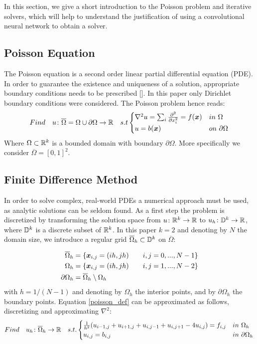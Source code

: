 In this section, we give a short introduction to the Poisson problem and iterative solvers, which will help to understand the justification of using a convolutional neural network to obtain a solver.

\subsection{Poisson Equation}

The Poisson equation is a second order linear partial differential equation (PDE). In order to guarantee the existence and uniqueness of a solution, appropriate boundary conditions needs to be prescribed [\cite{elliptic}]. In this paper only Dirichlet boundary conditions were considered.
The Poisson problem hence reads:
\begin{equation}
Find \quad u \colon \overline{\Omega}=\Omega\cup\partial\Omega \to {\mathbb{R}} \quad s.t
\begin{cases}
\nabla^2 u = \sum_{i}\frac{\partial^2}{\partial x_i^2} = f({\bm{x}}) & in \ \Omega\\
u = b({\bm{x}}) & on \ \partial \Omega\\
\end{cases}
\label{poisson_def}
\end{equation}
Where $\Omega \subset {\mathbb{R}}^k$ is a bounded domain with boundary $\partial\Omega$. More specifically we consider $\overline{\Omega} = [0,1]^2$.

\subsection{Finite Difference Method}
In order to solve complex, real-world PDEs a numerical approach must be used, as analytic solutions can be seldom found. As a first step the problem is discretized by transforming the solution space from $u\colon{\mathbb{R}}^k \to {\mathbb{R}}$ to $u_h\colon{\mathbb{D}}^k \to {\mathbb{R}}$, where ${\mathbb{D}}^k$ is a discrete subset of ${\mathbb{R}}^k$. In this paper $k = 2$ and denoting by $N$ the domain size, we introduce a regular grid $\overline{\Omega}_h \subset {\mathbb{D}}^k$ on  $\overline{\Omega}$: 

\begin{align*}
\overline{\Omega}_h &= \{{\bm{x}}_{i,j} = (ih, jh) \qquad i,j = 0,...,N-1 \} \\
{\Omega}_h &= \{{\bm{x}}_{i,j} = (ih, jh) \qquad i,j = 1,...,N-2 \} \\
\partial\Omega_h &= \overline{\Omega}_h \setminus {\Omega}_h
\end{align*}
with $h=1/(N-1)$ and denoting by ${\Omega}_h$ the interior points, and by $\partial\Omega_h$ the boundary points.
Equation \ref{poisson_def} can be approximated as follows, discretizing and approximating $\nabla^2$:
\begin{equation}
Find \quad u_h \colon \overline{\Omega}_h \to {\mathbb{R}} \quad s.t.
\begin{cases}
\frac{1}{h^2}(u_{i-1,j} + u_{i+1,j} + u_{i,j-1} + u_{i,j+1} - 4u_{i,j})=f_{i,j} & in \ \Omega_h \\
u_{i,j} = b_{i,j} & in \ \partial\Omega_h \\
\end{cases}
\label{Eq:discrete}
\end{equation}


